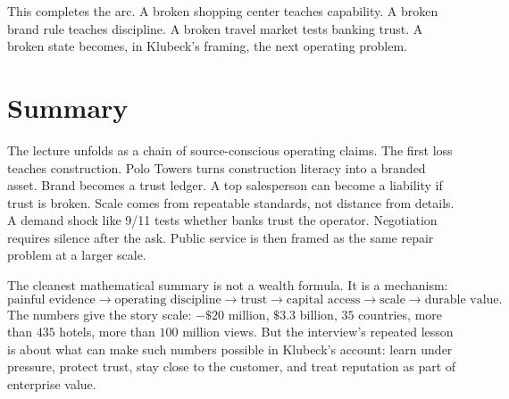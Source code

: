 This completes the arc. A broken shopping center teaches capability. A broken brand rule teaches discipline. A broken travel market tests banking trust. A broken state becomes, in Klubeck's framing, the next operating problem.

\section{Summary}

The lecture unfolds as a chain of source-conscious operating claims. The first loss teaches construction. Polo Towers turns construction literacy into a branded asset. Brand becomes a trust ledger. A top salesperson can become a liability if trust is broken. Scale comes from repeatable standards, not distance from details. A demand shock like 9/11 tests whether banks trust the operator. Negotiation requires silence after the ask. Public service is then framed as the same repair problem at a larger scale.

The cleanest mathematical summary is not a wealth formula. It is a mechanism:
\begin{equation}
\text{painful evidence}
\rightarrow
\text{operating discipline}
\rightarrow
\text{trust}
\rightarrow
\text{capital access}
\rightarrow
\text{scale}
\rightarrow
\text{durable value}.
\end{equation}
The numbers give the story scale: \(-\$20\) million, \(\$3.3\) billion, \(35\) countries, more than \(435\) hotels, more than \(100\) million views. But the interview's repeated lesson is about what can make such numbers possible in Klubeck's account: learn under pressure, protect trust, stay close to the customer, and treat reputation as part of enterprise value.